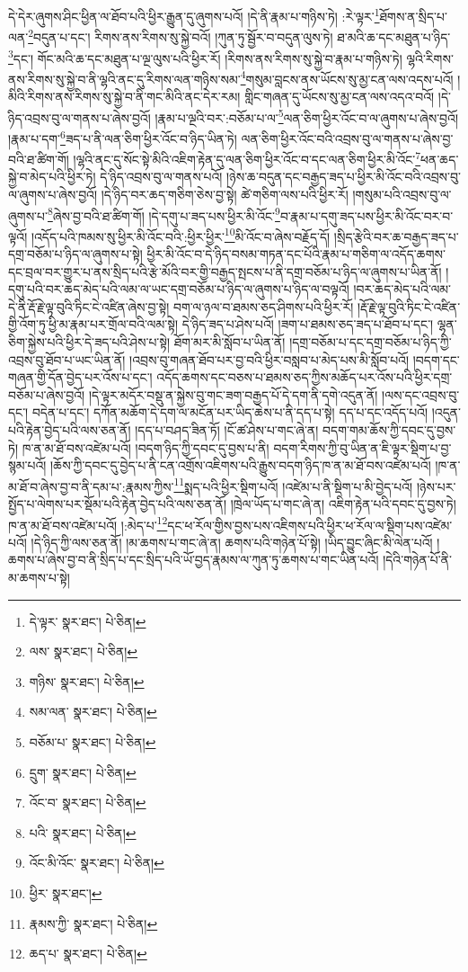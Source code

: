 དེ་དེར་ཞུགས་ཤིང་ཕྱིན་ལ་ཐོབ་པའི་ཕྱིར་རྒྱུན་དུ་ཞུགས་པའོ། །དེ་ནི་རྣམ་པ་གཉིས་ཏེ། :རེ་ལྟར་\footnote{དེ་ལྟར་  སྣར་ཐང་།  པེ་ཅིན། }ཐོགས་ན་སྲིད་པ་ལན་\footnote{ལས་  སྣར་ཐང་།  པེ་ཅིན། }བདུན་པ་དང་། རིགས་ནས་རིགས་སུ་སྐྱེ་བའོ། །ཀུན་ཏུ་སྦྱོར་བ་བདུན་ལུས་ཏེ། ཐ་མའི་ཆ་དང་མཐུན་པ་ཉིད་\footnote{གཉིས་  སྣར་ཐང་།  པེ་ཅིན། }དང་། གོང་མའི་ཆ་དང་མཐུན་པ་ལྔ་ལུས་པའི་ཕྱིར་རོ། །རིགས་ནས་རིགས་སུ་སྐྱེ་བ་རྣམ་པ་གཉིས་ཏེ། ལྷའི་རིགས་ནས་རིགས་སུ་སྐྱེ་བ་ནི་ལྷའི་ནང་དུ་རིགས་ལན་གཉིས་སམ་\footnote{སམ་ལན་  སྣར་ཐང་།  པེ་ཅིན། }གསུམ་བླངས་ནས་ཡོངས་སུ་མྱ་ངན་ལས་འདས་པའོ། །མིའི་རིགས་ནས་རིགས་སུ་སྐྱེ་བ་ནི་གང་མིའི་ནང་དེར་རམ། གླིང་གཞན་དུ་ཡོངས་སུ་མྱ་ངན་ལས་འདའ་བའོ། །དེ་ཉིད་འབྲས་བུ་ལ་གནས་པ་ཞེས་བྱའོ། །རྣམ་པ་ལྔའི་བར་:བཅོམ་པ་ལ་\footnote{བཅོམ་པ་  སྣར་ཐང་།  པེ་ཅིན། }ལན་ཅིག་ཕྱིར་འོང་བ་ལ་ཞུགས་པ་ཞེས་བྱའོ། །རྣམ་པ་དག་\footnote{དྲུག་  སྣར་ཐང་།  པེ་ཅིན། }ཟད་པ་ནི་ལན་ཅིག་ཕྱིར་འོང་བ་ཉིད་ཡིན་ཏེ། ལན་ཅིག་ཕྱིར་འོང་བའི་འབྲས་བུ་ལ་གནས་པ་ཞེས་བྱ་བའི་ཐ་ཚིག་གོ། །ལྷའི་ནང་དུ་སོང་སྟེ་མིའི་འཇིག་རྟེན་དུ་ལན་ཅིག་ཕྱིར་འོང་བ་དང་ལན་ཅིག་ཕྱིར་མི་འོང་\footnote{འོང་བ་  སྣར་ཐང་།  པེ་ཅིན། }ཕན་ཆད་སྐྱེ་བ་མེད་པའི་ཕྱིར་ཏེ། དེ་ཉིད་འབྲས་བུ་ལ་གནས་པའོ། །ཉེས་ཆ་བདུན་དང་བརྒྱད་ཟད་པ་ཕྱིར་མི་འོང་བའི་འབྲས་བུ་ལ་ཞུགས་པ་ཞེས་བྱའོ། །དེ་ཉིད་བར་ཆད་གཅིག་ཅེས་བྱ་སྟེ། ཚེ་གཅིག་ལས་པའི་ཕྱིར་རོ། །གསུམ་པའི་འབྲས་བུ་ལ་ཞུགས་པ་\footnote{པའི་  སྣར་ཐང་།  པེ་ཅིན། }ཞེས་བྱ་བའི་ཐ་ཚིག་གོ། །དེ་དགུ་པ་ཟད་པས་ཕྱིར་མི་འོང་\footnote{འོང་མི་འོང་  སྣར་ཐང་།  པེ་ཅིན། }བ་རྣམ་པ་དགུ་ཟད་པས་ཕྱིར་མི་འོང་བར་བ་ལྟའོ། །འདོད་པའི་ཁམས་སུ་ཕྱིར་མི་འོང་བའི་:ཕྱིར་ཕྱིར་\footnote{ཕྱིར་  སྣར་ཐང་། }མི་འོང་བ་ཞེས་བརྗོད་དོ། །སྲིད་རྩེའི་བར་ཆ་བརྒྱད་ཟད་པ་དགྲ་བཅོམ་པ་ཉིད་ལ་ཞུགས་པ་སྟེ། ཕྱིར་མི་འོང་བ་དེ་ཉིད་བསམ་གཏན་དང་པོའི་རྣམ་པ་གཅིག་ལ་འདོད་ཆགས་དང་བྲལ་བར་གྱུར་པ་ནས་སྲིད་པའི་རྩེ་མོའི་བར་གྱི་བརྒྱད་སྤངས་པ་ནི་དགྲ་བཅོམ་པ་ཉིད་ལ་ཞུགས་པ་ཡིན་ནོ། །དགུ་པའི་བར་ཆད་མེད་པའི་ལམ་ལ་ཡང་དགྲ་བཅོམ་པ་ཉིད་ལ་ཞུགས་པ་ཉིད་ལ་བལྟའོ། །བར་ཆད་མེད་པའི་ལམ་དེ་ནི་རྡོ་རྗེ་ལྟ་བུའི་ཏིང་ངེ་འཛིན་ཞེས་བྱ་སྟེ། བག་ལ་ཉལ་བ་ཐམས་ཅད་ཤིགས་པའི་ཕྱིར་རོ། །རྡོ་རྗེ་ལྟ་བུའི་ཏིང་ངེ་འཛིན་གྱི་འོག་ཏུ་ཕྱི་མ་རྣམ་པར་གྲོལ་བའི་ལམ་སྟེ། དེ་ཉིད་ཟད་པ་ཤེས་པའོ། །ཟག་པ་ཐམས་ཅད་ཟད་པ་ཐོབ་པ་དང་། ལྷན་ཅིག་སྐྱེས་པའི་ཕྱིར་དེ་ཟད་པའི་ཤེས་པ་སྟེ། ཐོག་མར་མི་སློབ་པ་ཡིན་ནོ། །དགྲ་བཅོམ་པ་དང་དགྲ་བཅོམ་པ་ཉིད་ཀྱི་འབྲས་བུ་ཐོབ་པ་ཡང་ཡིན་ནོ། །འབྲས་བུ་གཞན་ཐོབ་པར་བྱ་བའི་ཕྱིར་བསླབ་པ་མེད་པས་མི་སློབ་པའོ། །བདག་དང་གཞན་གྱི་དོན་བྱེད་པར་འོས་པ་དང་། འདོད་ཆགས་དང་བཅས་པ་ཐམས་ཅད་ཀྱིས་མཆོད་པར་འོས་པའི་ཕྱིར་དགྲ་བཅོམ་པ་ཞེས་བྱའོ། །དེ་ལྟར་མདོར་བསྡུ་ན་སྐྱེས་བུ་གང་ཟག་བརྒྱད་པོ་དེ་དག་ནི་དགེ་འདུན་ནོ། །ལས་དང་འབྲས་བུ་དང་། བདེན་པ་དང་། དཀོན་མཆོག་དེ་དག་ལ་མངོན་པར་ཡིད་ཆེས་པ་ནི་དད་པ་སྟེ། དད་པ་དང་འདོད་པའོ། །འདུན་པའི་རྟེན་བྱེད་པའི་ལས་ཅན་ནོ། །དད་པ་བཤད་ཟིན་ཏོ། །ངོ་ཚ་ཤེས་པ་གང་ཞེ་ན། བདག་གམ་ཆོས་ཀྱི་དབང་དུ་བྱས་ཏེ། ཁ་ན་མ་ཐོ་བས་འཛེམ་པའོ། །བདག་ཉིད་ཀྱི་དབང་དུ་བྱས་པ་ནི། བདག་རིགས་ཀྱི་བུ་ཡིན་ན་ཇི་ལྟར་སྡིག་པ་བྱ་སྙམ་པའོ། །ཆོས་ཀྱི་དབང་དུ་བྱེད་པ་ནི་ངན་འགྲོས་འཇིགས་པའི་རྒྱུས་བདག་ཉིད་ཁ་ན་མ་ཐོ་བས་འཛེམ་པའོ། །ཁ་ན་མ་ཐོ་བ་ཞེས་བྱ་བ་ནི་དམ་པ་:རྣམས་ཀྱིས་\footnote{རྣམས་ཀྱི་  སྣར་ཐང་།  པེ་ཅིན། }སྨད་པའི་ཕྱིར་སྡིག་པའོ། །འཛེམ་པ་ནི་སྡིག་པ་མི་བྱེད་པའོ། །ཉེས་པར་སྤྱོད་པ་ལེགས་པར་སྡོམ་པའི་རྟེན་བྱེད་པའི་ལས་ཅན་ནོ། །ཁྲེལ་ཡོད་པ་གང་ཞེ་ན། འཇིག་རྟེན་པའི་དབང་དུ་བྱས་ཏེ། ཁ་ན་མ་ཐོ་བས་འཛེམ་པའོ། །:མེད་པ་\footnote{ཆད་པ་  སྣར་ཐང་།  པེ་ཅིན། }དང་ཕ་རོལ་གྱིས་བྱས་པས་འཇིགས་པའི་ཕྱིར་ཕ་རོལ་ལ་སྡིག་པས་འཛེམ་པའོ། །དེ་ཉིད་ཀྱི་ལས་ཅན་ནོ། །མ་ཆགས་པ་གང་ཞེ་ན། ཆགས་པའི་གཉེན་པོ་སྟེ། །ཡིད་བྱུང་ཞིང་མི་ལེན་པའོ། །ཆགས་པ་ཞེས་བྱ་བ་ནི་སྲིད་པ་དང་སྲིད་པའི་ཡོ་བྱད་རྣམས་ལ་ཀུན་ཏུ་ཆགས་པ་གང་ཡིན་པའོ། །དེའི་གཉེན་པོ་ནི་མ་ཆགས་པ་སྟེ། 